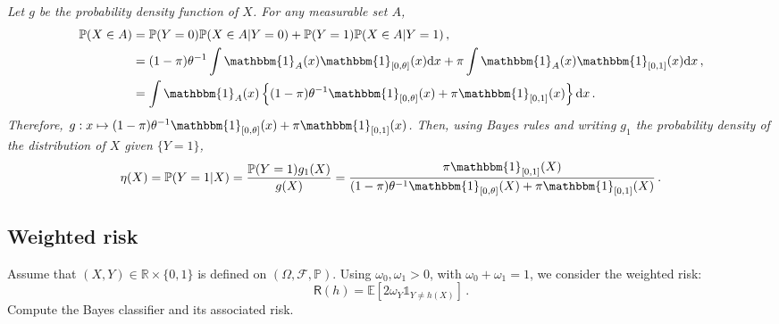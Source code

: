 \documentclass[a4paper,10pt,fleqn]{article}
\newcommand{\eqsp}{\,}
\newcommand{\rmd}{\mathrm{d}}
\newcommand{\bP}{\mathbb{P}}
\newcommand{\1}{\ensuremath{\mathbbm{1}}}
\newcommand{\bE}{\mathbb{E}}
\begin{document}
\vspace{.2cm}

{\em
Let $g$ be the probability density function of $X$. For any measurable set $A$,
\begin{align*}
\mathbb{P}(X\in A) &= \mathbb{P}(Y=0)\mathbb{P}(X\in A|Y=0) + \mathbb{P}(Y=1)\mathbb{P}(X\in A|Y=1)\,,\\
&= (1-\pi) \theta^{-1}\int \1_A(x)\1_{[0,\theta]}(x) \rmd x + \pi \int \1_A(x)\1_{[0,1]}(x) \rmd x\,,\\
&= \int \1_A(x)\left\{ (1-\pi) \theta^{-1}\1_{[0,\theta]}(x) + \pi\1_{[0,1]}(x)\right\} \rmd x\,.
\end{align*}
Therefore, $g:x\mapsto  (1-\pi) \theta^{-1}\1_{[0,\theta]}(x) + \pi\1_{[0,1]}(x)$. Then, using Bayes rules and writing $g_1$ the probability density of the distribution of $X$ given $\{Y=1\}$,
$$
\eta(X) = \mathbb{P}(Y=1 |X) = \frac{ \mathbb{P}(Y=1)g_1(X)}{g(X)} = \frac{\pi \1_{[0,1]}(X)}{(1-\pi) \theta^{-1}\1_{[0,\theta]}(X) + \pi\1_{[0,1]}(X)}\eqsp.
$$

}


\subsection{Weighted risk}
Assume that $(X,Y)\in\mathbb{R}\times\{0,1\}$ is defined on $(\Omega,\mathcal{F},\mathbb{P})$. Using $\omega_0, \omega_1 >0$, with $\omega_0+\omega_1 = 1$, we  consider the weighted risk:
$$
\mathsf{R}(h) = \bE[2\omega_Y \mathds{1}_{Y\neq h(X)}]\,.
$$
Compute the Bayes classifier and its associated risk.

\vspace{.2cm}
\end{document}
